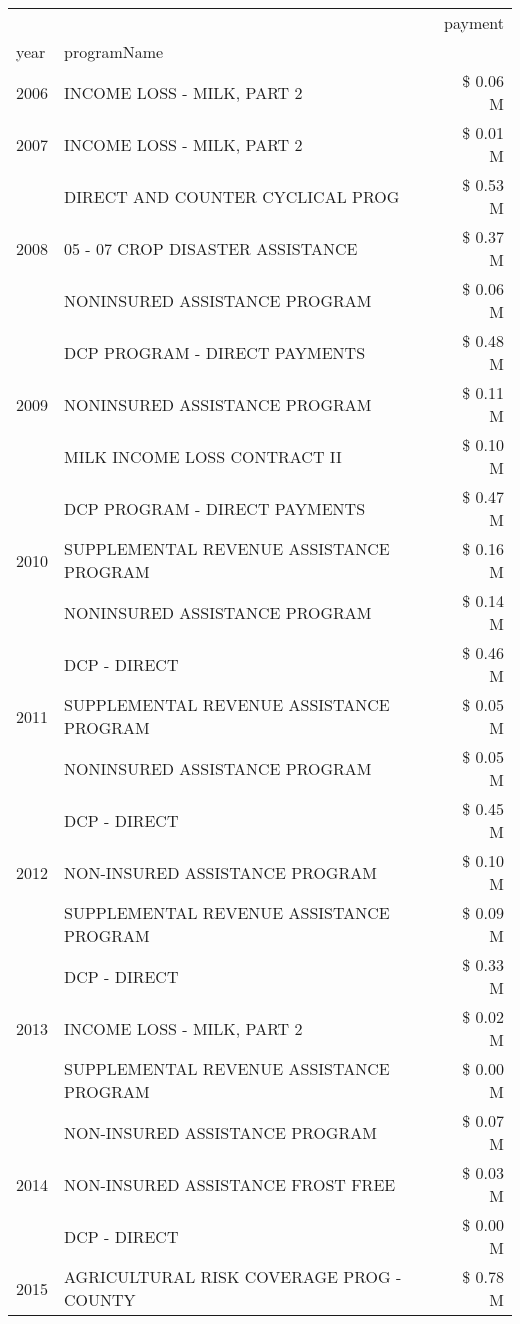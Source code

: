 \begin{tabular}{llr}
\toprule
 &  & payment \\
year & programName &  \\
\midrule
2006 & INCOME LOSS - MILK, PART 2 & \$ 0.06 M \\
\cline{1-3}
2007 & INCOME LOSS - MILK, PART 2 & \$ 0.01 M \\
\cline{1-3}
\multirow[t]{3}{*}{2008} & DIRECT AND COUNTER CYCLICAL PROG & \$ 0.53 M \\
 & 05 - 07 CROP DISASTER ASSISTANCE & \$ 0.37 M \\
 & NONINSURED ASSISTANCE PROGRAM & \$ 0.06 M \\
\cline{1-3}
\multirow[t]{3}{*}{2009} & DCP PROGRAM - DIRECT PAYMENTS & \$ 0.48 M \\
 & NONINSURED ASSISTANCE PROGRAM & \$ 0.11 M \\
 & MILK INCOME LOSS CONTRACT II & \$ 0.10 M \\
\cline{1-3}
\multirow[t]{3}{*}{2010} & DCP PROGRAM - DIRECT PAYMENTS & \$ 0.47 M \\
 & SUPPLEMENTAL REVENUE ASSISTANCE PROGRAM & \$ 0.16 M \\
 & NONINSURED ASSISTANCE PROGRAM & \$ 0.14 M \\
\cline{1-3}
\multirow[t]{3}{*}{2011} & DCP - DIRECT & \$ 0.46 M \\
 & SUPPLEMENTAL REVENUE ASSISTANCE PROGRAM & \$ 0.05 M \\
 & NONINSURED ASSISTANCE PROGRAM & \$ 0.05 M \\
\cline{1-3}
\multirow[t]{3}{*}{2012} & DCP - DIRECT & \$ 0.45 M \\
 & NON-INSURED ASSISTANCE PROGRAM & \$ 0.10 M \\
 & SUPPLEMENTAL REVENUE ASSISTANCE PROGRAM & \$ 0.09 M \\
\cline{1-3}
\multirow[t]{3}{*}{2013} & DCP - DIRECT & \$ 0.33 M \\
 & INCOME LOSS - MILK, PART 2 & \$ 0.02 M \\
 & SUPPLEMENTAL REVENUE ASSISTANCE PROGRAM & \$ 0.00 M \\
\cline{1-3}
\multirow[t]{3}{*}{2014} & NON-INSURED ASSISTANCE PROGRAM & \$ 0.07 M \\
 & NON-INSURED ASSISTANCE FROST FREE & \$ 0.03 M \\
 & DCP - DIRECT & \$ 0.00 M \\
\cline{1-3}
\multirow[t]{3}{*}{2015} & AGRICULTURAL RISK COVERAGE PROG - COUNTY & \$ 0.78 M \\

\end{tabular}
